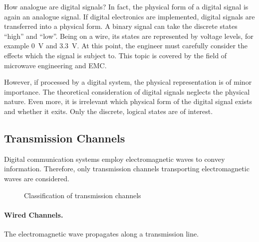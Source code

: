 \begin{refsection}
\begin{excursus}{How analogue are digital signals?}
	In fact, the physical form of a digital signal is again an analogue signal. If digital electronics are implemented, digital signals are transferred into a physical form. A binary signal can take the discrete states ``high'' and ``low''. Being on a wire, its states are represented by voltage levels, for example \SI{0}{V} and \SI{3.3}{V}. At this point, the engineer must carefully consider the effects which the signal is subject to. This topic is covered by the field of microwave engineering and \ac{EMC}.
	
	However, if processed by a digital system, the physical representation is of minor importance. The theoretical consideration of digital signals neglects the physical nature. Even more, it is irrelevant which physical form of the digital signal exists and whether it exits. Only the discrete, logical states are of interest.
\end{excursus}


\subsection{Transmission Channels}

Digital communication systems employ electromagnetic waves to convey information. Therefore, only transmission channels transporting electromagnetic waves are considered.

\begin{figure}[H]
	\centering
	\caption{Classification of transmission channels}
	\label{fig:ch01:trans_ch_classif}
\end{figure}

\paragraph{Wired Channels.}

The electromagnetic wave propagates along a transmission line.


\end{refsection}
